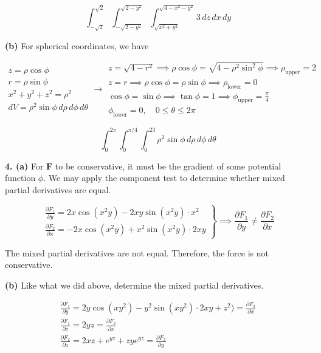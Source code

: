 \documentclass{article}
\begin{document}
\[\boxed{\int_{-\sqrt2}^{\sqrt2}\int_{-\sqrt{2-y^2}}^{\sqrt{2-y^2}}\int_{\sqrt{x^2+y^2}}^{\sqrt{4-x^2-y^2}}3\,dz\,dx\,dy}\]

\textbf{(b)} For spherical coordinates, we have

\[
\begin{array}{c}
z=\rho\cos\phi\\
r=\rho\sin\phi\\
x^2+y^2+z^2=\rho^2\\
dV=\rho^2\sin\phi\,d\rho\,d\phi\,d\theta
\end{array}\rightarrow
\begin{array}{c}
z=\sqrt{4-r^2}\implies\rho\cos\phi=\sqrt{4-\rho^2\sin^2\phi}\implies\rho_{\text{upper}}=2\\
z=r\implies\rho\cos\phi=\rho\sin\phi\implies\rho_{\text{lower}}=0\\[1em]
\displaystyle\cos\phi=\sin\phi\implies\tan\phi=1\implies\phi_{\text{upper}}=\frac\pi4\\
\phi_{\text{lower}}=0,\quad 0\leq\theta\leq2\pi
\end{array}
\]

\[\boxed{\int_0^{2\pi}\int_{0}^{\pi/4}\int_0^23\rho^2\sin\phi\,d\rho\,d\phi\,d\theta}\]

\vspace{1em}

\textbf{4. (a)} For $\mathbf{F}$ to be conservative, it must be the gradient of some potential function $\phi$. We may apply the component test to determine whether mixed partial derivatives are equal.

\[
\left.
\begin{array}{l}
\displaystyle\frac{\partial{F}_1}{\partial y}=2x\cos\left(x^2y\right)-2xy\sin\left(x^2y\right)\cdot x^2\\[1em]
\displaystyle\frac{\partial{F}_2}{\partial x}=-2x\cos\left(x^2y\right)+x^2\sin\left(x^2y\right)\cdot 2xy
\end{array}\right\}\implies\displaystyle\frac{\partial{F}_1}{\partial y}\neq\displaystyle\frac{\partial{F}_2}{\partial x}
\]

The mixed partial derivatives are not equal. Therefore, the force is not conservative.

\textbf{(b)} Like what we did above, determine the mixed partial derivatives.

\[
\begin{array}{c}
\displaystyle\frac{\partial{F}_1}{\partial y}=2y\cos\left(xy^2\right)-y^2\sin\left(xy^2\right)\cdot2xy+z^2)=\frac{\partial{F}_2}{\partial x}\\[1em]
\displaystyle\frac{\partial{F}_1}{\partial z}=2yz=\frac{\partial{F}_3}{\partial x}\\[1em]
\displaystyle\frac{\partial{F}_2}{\partial z}=2xz+{e}^{yz}+zy{e}^{yz}=\frac{\partial{F}_3}{\partial y}
\end{array}
\]
\end{document}
